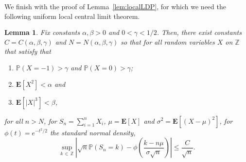 \documentclass[10pt]{amsart}
\newtheorem{lemm}[theo]{Lemma}\newtheorem{prop}[theo]{Proposition}\newtheorem{coro}[theo]{Corollary}\newtheorem{conj}[theo]{Conjecture}
\theoremstyle{definition}\newtheorem{defi}[theo]{Definition}\newtheorem{rema}[theo]{Remark}\newtheorem{exam}[theo]{Example}\newtheorem{exem}[theo]{Example}\newtheorem{nota}[theo]{Notation}
\newcommand{\Z}{\mathbb{Z}}
\renewcommand{\P}{\mathbb{P}}
\newcommand{\E}[1]{{\mathbf E}\left[#1\right]}
\begin{document}
We finish with the proof of Lemma~\ref{lem:localLDP}, for which we need the following uniform local central limit theorem.
\begin{lemm}\label{lem:local}
Fix constants $\alpha, \beta >0$ and $0<\gamma<1/2$. Then, there exist constants $C=C(\alpha, \beta, \gamma)$ and $N=N(\alpha, \beta, \gamma)$ so that for all random variables $X$ on $\Z$ that satisfy that
\begin{enumerate}
\item $\P(X=-1)>\gamma$ and $\P(X=0)>\gamma$;
\item $\E{X^2}<\alpha$ and
\item $\E{|X|^3}<\beta $,
\end{enumerate}
for all $n>N$, for $S_n=\sum_{i=1}^n X_i$, $\mu=\E{X}$ and $\sigma^2=\E{(X-\mu)^2}$, for $\phi(t)=e^{-t^2/2}$ the standard normal density,
\[
\sup_{k\,\in\,\Z} \left|\sqrt{n}\P\left(S_n=k\right)-\phi\left(\frac{k-n\mu}{\sigma\sqrt{n}}\right) \right|\leq \frac{C}{\sqrt{n}}.
\]
\end{lemm}
\end{document}
